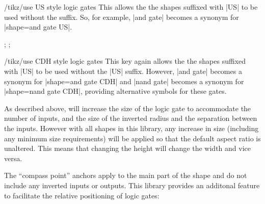\begin{key}{/tikz/use US style logic gates}
  This allows the the shapes suffixed with |US| to be used without
  the suffix. So, for example, |and gate| becomes a synonym for
  |shape=and gate US|.
\begin{codeexample}[]
\tikz{};
\space
{};
\end{codeexample}
\end{key}

\begin{key}{/tikz/use CDH style logic gates}
  This key again allows the the shapes suffixed with |US| to be used 
  without the |US| suffix. However, |and gate| becomes a synonym for
  |shape=and gate CDH| and |nand gate| becomes a synonym for
  |shape=nand gate CDH|, providing alternative symbols for these
  gates.
	
\begin{codeexample}[]
\end{codeexample}
\end{key}


As described above, \pgfname{} will increase the size of the 
logic gate to accommodate the number of inputs, and the size
of the inverted radius and the separation between the inputs.
However with all shapes in this library, any increase in size 
(including any minimum size requirements) will be applied so that 
the default aspect ratio is unaltered. This means that changing
the height will change the width and vice versa. 

The ``compass point'' anchors apply to the main part of the shape
and do not include any inverted inputs or outputs. This library
provides an additonal feature to facilitate the relative positioning
of logic gates:


